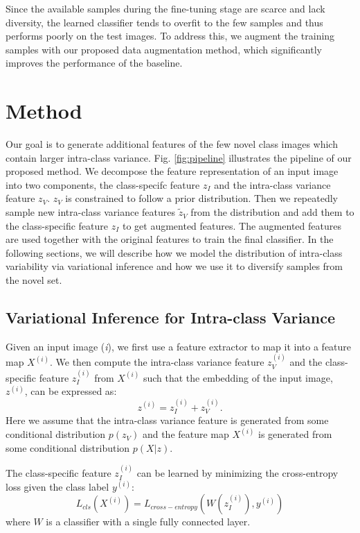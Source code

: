 \documentclass[10pt,twocolumn,letterpaper]{article}
\begin{document}
Since the available samples during the fine-tuning stage are scarce and lack diversity, the learned classifier tends to overfit to the few samples and thus performs poorly on the test images.
To address this, we augment the training samples with our proposed data augmentation method, which significantly improves the performance of the baseline.
   
\section{Method}
  Our goal is to generate additional features of the few novel class images which contain larger intra-class variance.
Fig. \ref{fig:pipeline} illustrates the pipeline of our proposed method.
We decompose the feature representation of an input image into two components, the class-specifc feature $z_I$ and the intra-class variance feature $z_V$.
$z_V$ is constrained to follow a prior distribution.
Then we repeatedly sample new intra-class variance features $\tilde{z}_V$  from the distribution and add them to the class-specific feature $z_I$ to get augmented features.
The augmented features are used together with the original features to train the final classifier. In the following sections, we will describe how we model the distribution of intra-class variability via variational inference and how we use it to diversify samples from the novel set.
\subsection{Variational Inference for Intra-class Variance} \label{variational_infer_intra_variance}
      
      Given an input image (\textit{i}), we first use a feature extractor to map it into a feature map $X^{(i)}$.
We then compute the intra-class variance feature  $z_V^{(i)}$ and the class-specific feature $z_I^{(i)}$ from $X^{(i)}$ such that the embedding of the input image, $z^{(i)}$, can be expressed as:
      \begin{equation}
          z^{(i)} = z_I^{(i)} + z_V^{(i)}.
      \end{equation}
Here we assume that the intra-class variance feature is generated from some conditional distribution $p(z_V)$ and the feature map $X^{(i)}$ is generated from some conditional distribution $p(X|z)$.
      
      The class-specific feature $z_I^{(i)}$ can be learned by minimizing the cross-entropy loss given the class label $y^{(i)}$:
\begin{equation}
        L_{cls}(X^{(i)}) = L_{cross-entropy}\left(W(z_I^{(i)}), y^{(i)}\right)
      \end{equation}
      where $W$ is a classifier with a single fully connected layer. 
\end{document}

